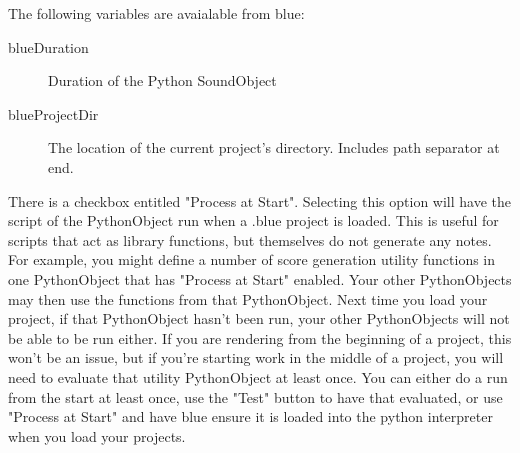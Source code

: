 The following variables are avaialable from blue:

\begin{description}
\item[blueDuration]
Duration of the Python SoundObject
\item[blueProjectDir]
The location of the current project's directory. Includes path separator
at end.
\end{description}

There is a checkbox entitled "Process at Start". Selecting this option
will have the script of the PythonObject run when a .blue project is
loaded. This is useful for scripts that act as library functions, but
themselves do not generate any notes. For example, you might define a
number of score generation utility functions in one PythonObject that
has "Process at Start" enabled. Your other PythonObjects may then use
the functions from that PythonObject. Next time you load your project,
if that PythonObject hasn't been run, your other PythonObjects will not
be able to be run either. If you are rendering from the beginning of a
project, this won't be an issue, but if you're starting work in the
middle of a project, you will need to evaluate that utility PythonObject
at least once. You can either do a run from the start at least once, use
the "Test" button to have that evaluated, or use "Process at Start" and
have blue ensure it is loaded into the python interpreter when you load
your projects.
